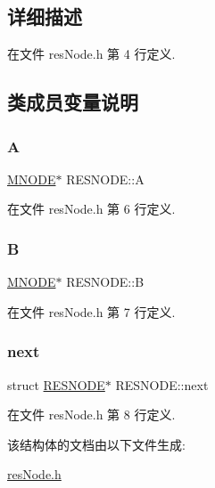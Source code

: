 \subsection{详细描述}


在文件 res\+Node.\+h 第 4 行定义.



\subsection{类成员变量说明}
\mbox{\label{struct_r_e_s_n_o_d_e_a51a4dc6b4f237be6b7668edec10f54c9}} 
\subsubsection{\texorpdfstring{A}{A}}
{\footnotesize\ttfamily \hyperlink{_member_node_8h_af952c400512f5ff05a9356b68cb15730}{M\+N\+O\+DE}$\ast$ R\+E\+S\+N\+O\+D\+E\+::A}



在文件 res\+Node.\+h 第 6 行定义.

\mbox{\label{struct_r_e_s_n_o_d_e_a7f54a8463ffa2e0e459aaf2de9beee47}} 
\subsubsection{\texorpdfstring{B}{B}}
{\footnotesize\ttfamily \hyperlink{_member_node_8h_af952c400512f5ff05a9356b68cb15730}{M\+N\+O\+DE}$\ast$ R\+E\+S\+N\+O\+D\+E\+::B}



在文件 res\+Node.\+h 第 7 行定义.

\mbox{\label{struct_r_e_s_n_o_d_e_a76de7271a9ebedfb82e49bab978d3dd5}} 
\subsubsection{\texorpdfstring{next}{next}}
{\footnotesize\ttfamily struct \hyperlink{struct_r_e_s_n_o_d_e}{R\+E\+S\+N\+O\+DE}$\ast$ R\+E\+S\+N\+O\+D\+E\+::next}



在文件 res\+Node.\+h 第 8 行定义.



该结构体的文档由以下文件生成\+:\begin{DoxyCompactItemize}
\item 
\hyperlink{res_node_8h}{res\+Node.\+h}\end{DoxyCompactItemize}
